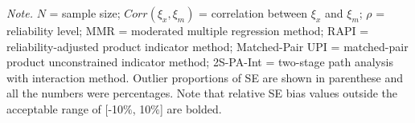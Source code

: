 \documentclass[
  man]{apa6}
\newenvironment{lltable}{\begin{landscape}\centering\begin{ThreePartTable}}{\end{ThreePartTable}\end{landscape}}
\begin{document}
\begin{lltable}

\begin{TableNotes}[para]
\normalsize{\textit{Note.} $\textit{N}$ = sample size; $Corr(\xi_{x}, \xi_{m})$ = correlation between $\xi_{x}$ and $\xi_{m}$; $\rho$ = reliability level; MMR = moderated multiple regression method; RAPI = reliability-adjusted product indicator method; Matched-Pair UPI = matched-pair product unconstrained indicator method; 2S-PA-Int = two-stage path analysis with interaction method. Outlier proportions of SE are shown in parenthese and all the numbers were percentages. Note that relative SE bias values outside the acceptable range of [-10$\%$, 10$\%$] are bolded.}
\end{TableNotes}

\tiny{

}
\end{lltable}
\end{document}
